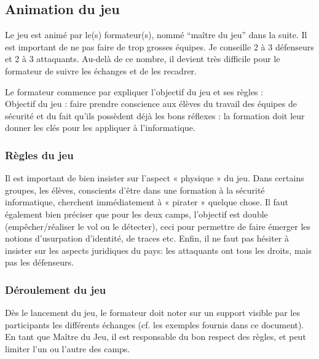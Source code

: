 \documentclass[11pt]{article} %
\begin{document}
\subsection{Animation du jeu}
Le jeu est animé par le(s) formateur(s), nommé ``maître du jeu'' dans la suite.
Il est important de ne pas faire de trop grosses équipes. Je conseille 2 à 3
défenseurs et 2 à 3 attaquants. Au-delà de ce nombre, il devient très difficile
pour le formateur de suivre les échanges et de les recadrer.

Le formateur commence par expliquer l'objectif du jeu et ses règles : \\

Objectif du jeu : faire prendre conscience aux élèves du travail des équipes de
sécurité et du fait qu'ils possèdent déjà les bons réflexes : la formation doit
leur donner les clés pour les appliquer à l'informatique.

\subsubsection{Règles du jeu} 
Il est important de bien insister sur l'aspect « physique » du jeu. Dans
certains groupes, les élèves, conscients d'être dans une formation à la sécurité
informatique, cherchent immédiatement à « pirater » quelque chose. Il faut
également bien préciser que pour les deux camps, l'objectif est double
(empêcher/réaliser le vol ou le détecter), ceci pour permettre de faire émerger
les notions d'usurpation d'identité, de traces etc. Enfin, il ne faut pas
hésiter à insister sur les aspects juridiques du pays: les attaquants ont tous
les droits, mais pas les défenseurs.

\subsubsection{Déroulement du jeu}
Dès le lancement du jeu, le formateur doit noter sur un support visible par les
participants les différents échanges (cf. les exemples fournis dans ce
document). En tant que Maître du Jeu, il est responsable du bon respect des
règles, et peut limiter l'un ou l'autre des camps.
\end{document}
